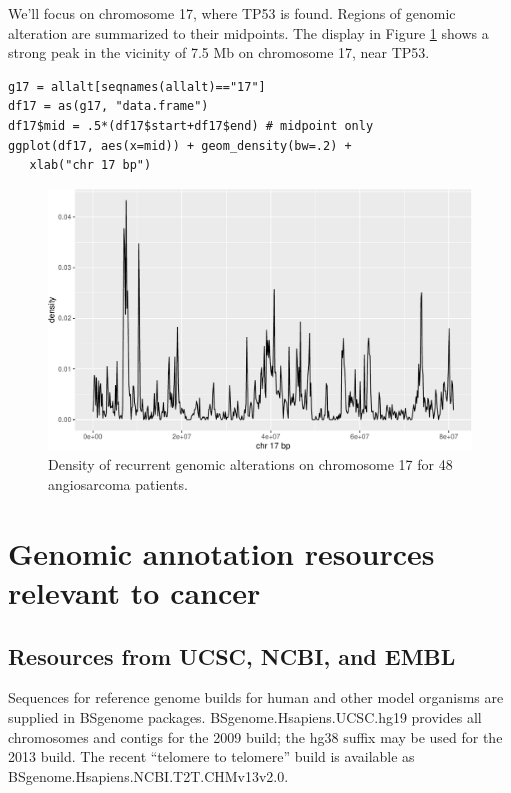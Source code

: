 \documentclass[graybox]{svmult}
\begin{document}
We'll focus on chromosome 17, where TP53 is found. Regions
of genomic alteration are summarized to their midpoints.
The display in Figure \ref{fig:mkden} shows a strong peak in the vicinity of 7.5 Mb on chromosome 17, near TP53.

\begin{shaded}
\begin{verbatim}
g17 = allalt[seqnames(allalt)=="17"]
df17 = as(g17, "data.frame")
df17$mid = .5*(df17$start+df17$end) # midpoint only
ggplot(df17, aes(x=mid)) + geom_density(bw=.2) + 
   xlab("chr 17 bp")
\end{verbatim}
\end{shaded}


\begin{figure}
\includegraphics[width=1\linewidth,]{bioccb_files/figure-latex/mkden-1} \caption{Density of recurrent genomic alterations on chromosome 17 for 48 angiosarcoma patients.}\label{fig:mkden}
\end{figure}



\section{Genomic annotation resources relevant to cancer}\label{hubs}


\subsection{Resources from UCSC, NCBI, and EMBL}\label{resources-from-ucsc-ncbi-and-embl}

Sequences for reference genome builds for human and
other model organisms are supplied in BSgenome packages.
BSgenome.Hsapiens.UCSC.hg19 provides all chromosomes and
contigs for the 2009 build; the hg38 suffix may be used
for the 2013 build. The recent ``telomere to telomere''
build is available as BSgenome.Hsapiens.NCBI.T2T.CHMv13v2.0.
\end{document}
